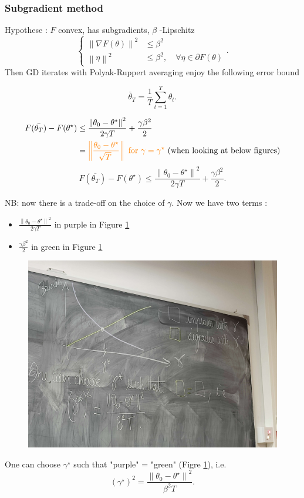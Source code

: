 \subsubsection{Subgradient method}
\begin{thm}
    Hypothese : $ F $ convex, has subgradients, $ \beta  $ -Lipschitz 
        \[
            \begin{cases}
                \left\| \nabla F(\theta ) \right\| ^2 &\leq \beta ^2\\
                \left\| \eta  \right\| ^2 &\leq \beta ^2, \quad \forall \eta \in \partial F(\theta)
            \end{cases} 
        .\]
    Then GD iterates with Polyak-Ruppert averaging enjoy the following error bound 
    
    \[
        \bar{\theta }_T = \frac{1}{T} \sum_{t=1}^{T} \theta _t
    .\]
    
    \begin{align*}
        F(\bar{\theta_T}) - F(\theta ^{\star}) 
            &\leq \frac{\left\| \theta_0 - \theta ^{\star } \right\|^2 }{2 \gamma T} +  \frac{\gamma \beta ^2}{2} \\
            &= \textcolor{orange}{\left\| \frac{\theta _0 - \theta^{\star }}{\sqrt[]{T}} \right\| \text{ for } \gamma = \gamma ^{\star}} 
        \text{ (when looking at below figures)}
    \end{align*}
    \[
        F(\bar{\theta_T}) - F(\theta ^{\star}) \leq \frac{\left\| \theta_0 - \theta ^{\star } \right\|^2 }{2 \gamma T} +  \frac{\gamma \beta ^2}{2}     
    .\]
\end{thm}
NB: now there is a trade-off on the choice of $ \gamma  $. Now we have two terms : 
\begin{itemize}
    \item $ \frac{\left\| \theta_0 - \theta ^{\star } \right\|^2 }{2 \gamma T}  $ in purple in Figure \ref*{fig:tradeoff}
    \item $ \frac{\gamma \beta ^2}{2}  $ in green  in Figure \ref*{fig:tradeoff}
\end{itemize}
\begin{figure}[!h]
    \centering
    \includegraphics[width=.75\textwidth]{figs/gamma_compromise.jpg}
    \caption{ }
    \label{fig:tradeoff}
\end{figure}
One can choose $ \gamma ^\star  $ such that "purple" = "green" (Figre \ref*{fig:tradeoff}), i.e. 
\[
    (\gamma ^\star )^2 = \frac{\left\| \theta _0 - \theta ^\star  \right\| ^2}{\beta ^2 T}
.\]

